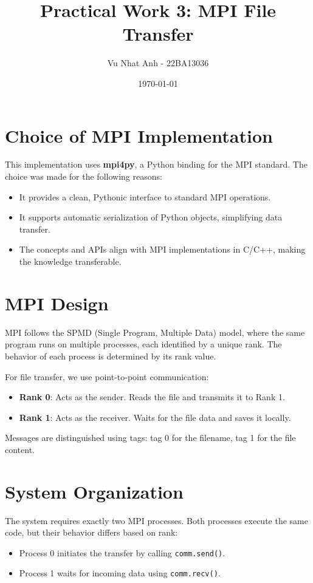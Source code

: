 \documentclass{article}
\title{Practical Work 3: MPI File Transfer}
\author{Vu Nhat Anh - 22BA13036}
\date{\today}
\begin{document}
\maketitle

\section{Choice of MPI Implementation}
This implementation uses \textbf{mpi4py}, a Python binding for the MPI standard. The choice was made for the following reasons:
\begin{itemize}
    \item It provides a clean, Pythonic interface to standard MPI operations.
    \item It supports automatic serialization of Python objects, simplifying data transfer.
    \item The concepts and APIs align with MPI implementations in C/C++, making the knowledge transferable.
\end{itemize}

\section{MPI Design}
MPI follows the SPMD (Single Program, Multiple Data) model, where the same program runs on multiple processes, each identified by a unique rank. The behavior of each process is determined by its rank value.

For file transfer, we use point-to-point communication:
\begin{itemize}
    \item \textbf{Rank 0}: Acts as the sender. Reads the file and transmits it to Rank 1.
    \item \textbf{Rank 1}: Acts as the receiver. Waits for the file data and saves it locally.
\end{itemize}

Messages are distinguished using tags: tag 0 for the filename, tag 1 for the file content.

\section{System Organization}
The system requires exactly two MPI processes. Both processes execute the same code, but their behavior differs based on rank:
\begin{itemize}
    \item Process 0 initiates the transfer by calling \texttt{comm.send()}.
    \item Process 1 waits for incoming data using \texttt{comm.recv()}.
\end{itemize}
\end{document}
